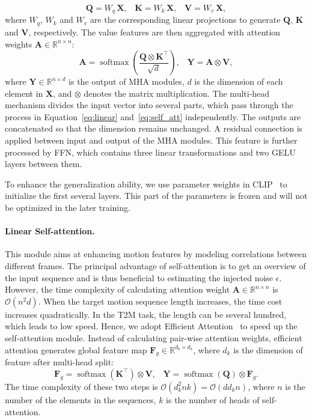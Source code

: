 \begin{equation}
\label{eq:linear}
    \textbf{Q} = W_q\, \textbf{X},\;\;\;
    \textbf{K} = W_k\, \textbf{X},\;\;\;
    \textbf{V} = W_v\, \textbf{X},
\end{equation}
where $W_q$, $W_k$ and $W_v$ are the corresponding linear projections to generate $\mathbf{Q}$, $\mathbf{K}$ and $\mathbf{V}$, respectively. 
The value features are then aggregated with attention weights $\mathbf{A}  \in \mathbb{R}^{n \times n}$:
\begin{equation}
\label{eq:self_att}
\mathbf{A}=\operatorname{softmax}(\frac{\mathbf{Q}\otimes \mathbf{K}^{\top}}{\sqrt{d}} ),\;\;\; \mathbf{Y}=\mathbf{A} \otimes \mathbf{V},
\end{equation}
where $\mathbf{Y}\in \mathbb{R}^{n \times d}$ is the output of MHA modules, $d$ is the dimension of each element in $\mathbf{X}$, and $\otimes$ denotes the matrix multiplication. The multi-head mechanism divides the input vector into several parts, which pass through the process in Equation~\ref{eq:linear} and~\ref{eq:self_att} independently. The outputs are concatenated so that the dimension remains unchanged. A residual connection is applied between input and output of the MHA modules. This feature is further processed by FFN, which contains three linear transformations and two GELU~\citep{hendrycks2016gaussian} layers between them.

To enhance the generalization ability, we use parameter weights in  CLIP~\citep{radford2021learning} to initialize the first several layers. This part of the parameters is frozen and will not be optimized in the later training.

\paragraph{Linear Self-attention.} This module aims at enhancing motion features by modeling correlations between different frames. The principal advantage of self-attention is to get an overview of the input sequence and is thus beneficial to estimating the injected noise $\epsilon$. However, the time complexity of calculating attention weight $\mathbf{A} \in \mathbb{R}^{n \times n}$ is $\mathcal{O}(n^2d)$. When the target motion sequence length increases, the time cost increases quadratically. In the T2M task, the length can be several hundred, which leads to low speed. Hence, we adopt Efficient Attention~\citep{shen2021efficient} to speed up the self-attention module. Instead of calculating pair-wise attention weights, efficient attention generates global feature map $\mathbf{F}_g \in \mathbb{R}^{d_k \times d_k}$, where $d_k$ is the dimension of feature after multi-head split:
\begin{equation}
    \mathbf{F}_g = \operatorname{softmax}(\mathbf{K}^{\top}) \otimes \mathbf{V},\;\;\; \mathbf{Y}=\operatorname{softmax}(\mathbf{Q}) \otimes \mathbf{F}_g.
\end{equation}
The time complexity of these two steps is $\mathcal{O}(d_k^2nk)=\mathcal{O}(dd_kn)$, where $n$ is the number of the elements in the sequences, $k$ is the number of heads of self-attention.



